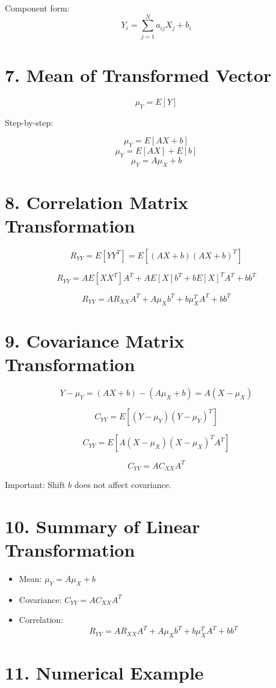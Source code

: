 \documentclass[12pt]{article}
\begin{document}
Component form:
\[
Y_i = \sum_{j=1}^{N} a_{ij} X_j + b_i
\]

\section*{7. Mean of Transformed Vector}

\[
\mu_Y = E[Y]
\]

Step-by-step:

\[
\mu_Y = E[AX + b]
\]
\[
\mu_Y = E[AX] + E[b]
\]
\[
\mu_Y = A\mu_X + b
\]

\section*{8. Correlation Matrix Transformation}

\[
R_{YY} = E[YY^T] = E[(AX + b)(AX + b)^T]
\]

\[
R_{YY} = AE[XX^T]A^T + AE[X]b^T + bE[X]^T A^T + bb^T
\]

\[
R_{YY} = AR_{XX}A^T + A\mu_X b^T + b\mu_X^T A^T + bb^T
\]

\section*{9. Covariance Matrix Transformation}

\[
Y - \mu_Y = (AX + b) - (A\mu_X + b) = A(X - \mu_X)
\]

\[
C_{YY} = E[(Y - \mu_Y)(Y - \mu_Y)^T]
\]

\[
C_{YY} = E[A(X - \mu_X)(X - \mu_X)^T A^T]
\]

\[
C_{YY} = AC_{XX}A^T
\]

Important: Shift $b$ does not affect covariance.

\section*{10. Summary of Linear Transformation}

\begin{itemize}
\item Mean: $\mu_Y = A\mu_X + b$
\item Covariance: $C_{YY} = AC_{XX}A^T$
\item Correlation:
\[
R_{YY} = AR_{XX}A^T + A\mu_X b^T + b\mu_X^T A^T + bb^T
\]
\end{itemize}

\section*{11. Numerical Example}
\end{document}
